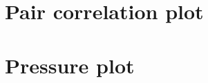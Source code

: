\documentclass[11pt,a4paper]{article}
\begin{document}

















\FloatBarrier
\section{Pair correlation plot}



\FloatBarrier
\section{Pressure plot}

\end{document}
